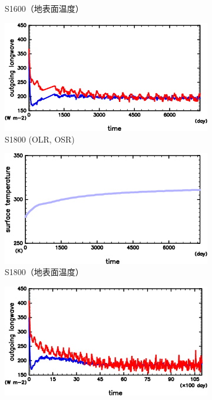 \documentclass[body]{subfiles}
\begin{document}
\begin{figure}[t]
\begin{subfigure}{.4\textwidth}
		\caption{S1600（地表面温度）}\label{S1600_SurfTemp}
	\end{subfigure}
	\begin{subfigure}{.4\textwidth}
		\centering
		\includegraphics[width=\columnwidth]{S1800/S1800_OLRA-OSRA_horimean_time0.0-7300.0-crop.png}
		\caption{S1800 (OLR, OSR)}\label{S1800_OLRA}
	\end{subfigure}
	\begin{subfigure}{.4\textwidth}
		\centering
		\includegraphics[width=\columnwidth]{S1800/S1800_SurfTemp_horimean_time0.0-7300.0-crop.png}
		\caption{S1800（地表面温度）}\label{S1800_SurfTemp}
	\end{subfigure}
	\begin{subfigure}{.4\textwidth}
		\centering
		\includegraphics[width=\columnwidth]{S2000/S2000_OLRA-OSRA_horimean_time0.0-10950.0-crop.png}

\end{subfigure}
\end{figure}
\end{document}
